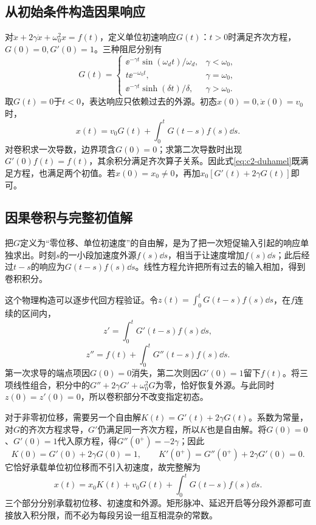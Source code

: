 \subsection{从初始条件构造因果响应}
对$\ddot x+2\gamma\dot x+\omega_0^2x=f(t)$，定义单位初速响应$G(t)$：$t>0$时满足齐次方程，$G(0)=0,G'(0)=1$。三种阻尼分别有
\begin{equation}\label{eq:c2-G}
G(t)=\begin{cases}
\ee^{-\gamma t}\sin(\omega_dt)/\omega_d,&\gamma<\omega_0,\\
t\ee^{-\omega_0t},&\gamma=\omega_0,\\
\ee^{-\gamma t}\sinh(\delta t)/\delta,&\gamma>\omega_0.
\end{cases}
\end{equation}
取$G(t)=0$于$t<0$，表达响应只依赖过去的外源。初态$x(0)=0,\dot x(0)=v_0$时，
\begin{equation}\label{eq:c2-duhamel}
x(t)=v_0G(t)+\int_0^tG(t-s)f(s)\dd s.
\end{equation}
对卷积求一次导数，边界项含$G(0)=0$；求第二次导数时出现$G'(0)f(t)=f(t)$，其余积分满足齐次算子关系。因此式\eqref{eq:c2-duhamel}既满足方程，也满足两个初值。若$x(0)=x_0\ne0$，再加$x_0[G'(t)+2\gamma G(t)]$即可。

\subsection{因果卷积与完整初值解}
把$G$定义为“零位移、单位初速度”的自由解，是为了把一次短促输入引起的响应单独求出。时刻$s$的一小段加速度外源$f(s)\dd s$，相当于让速度增加$f(s)\dd s$；此后经过$t-s$的响应为$G(t-s)f(s)\dd s$。线性方程允许把所有过去的输入相加，得到卷积积分。

这个物理构造可以逐步代回方程验证。令$z(t)=\int_0^tG(t-s)f(s)\dd s$，在$f$连续的区间内，
\[z'=\int_0^tG'(t-s)f(s)\dd s,\]
\[z''=f(t)+\int_0^tG''(t-s)f(s)\dd s.\]
第一次求导的端点项因$G(0)=0$消失，第二次则因$G'(0)=1$留下$f(t)$。将三项线性组合，积分中的$G''+2\gamma G'+\omega_0^2G$为零，恰好恢复外源。与此同时$z(0)=z'(0)=0$，所以卷积部分不改变指定初态。

对于非零初位移，需要另一个自由解$K(t)=G'(t)+2\gamma G(t)$。系数为常量，对$G$的齐次方程求导，$G'$仍满足同一齐次方程，所以$K$也是自由解。将$G(0)=0$、$G'(0)=1$代入原方程，得$G''(0^+)=-2\gamma$；因此
\[
 K(0)=G'(0)+2\gamma G(0)=1,\qquad
 K'(0^+)=G''(0^+)+2\gamma G'(0)=0.
\]
它恰好承载单位初位移而不引入初速度，故完整解为
\[x(t)=x_0K(t)+v_0G(t)+\int_0^tG(t-s)f(s)\dd s.\]
三个部分分别承载初位移、初速度和外源。矩形脉冲、延迟开启等分段外源都可直接放入积分限，而不必为每段另设一组互相混杂的常数。

